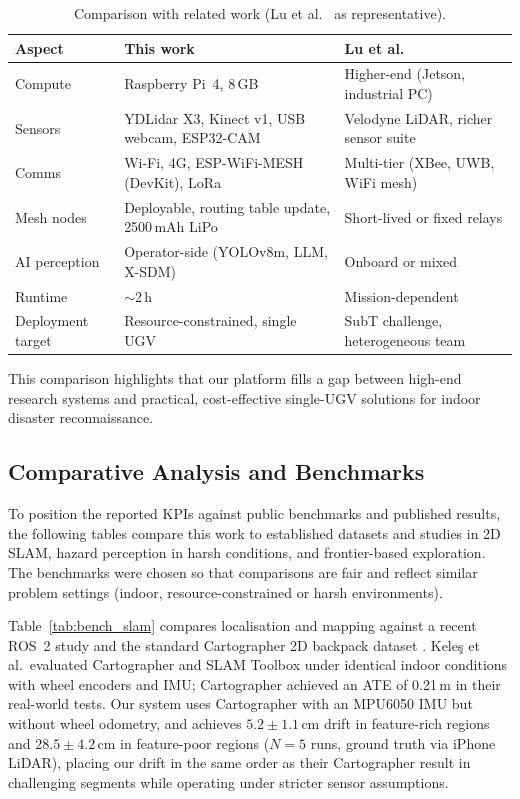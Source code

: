 \begin{table}[htbp]
\caption{Comparison with related work (Lu et al.\ \cite{lu2022} as representative).}
\label{tab:comparison}
\centering
\begin{tabular}{p{2cm}p{4cm}p{4cm}}
\toprule
\textbf{Aspect} & \textbf{This work} & \textbf{Lu et al.} \\
\midrule
Compute & Raspberry Pi~4, 8\,GB & Higher-end (Jetson, industrial PC) \\
Sensors & YDLidar X3, Kinect v1, USB webcam, ESP32-CAM & Velodyne LiDAR, richer sensor suite \\
Comms & Wi-Fi, 4G, ESP-WiFi-MESH (DevKit), LoRa & Multi-tier (XBee, UWB, WiFi mesh) \\
Mesh nodes & Deployable, routing table update, 2500\,mAh LiPo & Short-lived or fixed relays \\
AI perception & Operator-side (YOLOv8m, LLM, X-SDM) & Onboard or mixed \\
Runtime & $\sim$2\,h & Mission-dependent \\
Deployment target & Resource-constrained, single UGV & SubT challenge, heterogeneous team \\
\bottomrule
\end{tabular}
\end{table}

This comparison highlights that our platform fills a gap between high-end research systems and practical, cost-effective single-UGV solutions for indoor disaster reconnaissance.

\subsection{Comparative Analysis and Benchmarks}

To position the reported KPIs against public benchmarks and published results, the following tables compare this work to established datasets and studies in 2D SLAM, hazard perception in harsh conditions, and frontier-based exploration. The benchmarks were chosen so that comparisons are fair and reflect similar problem settings (indoor, resource-constrained or harsh environments).

Table~\ref{tab:bench_slam} compares localisation and mapping against a recent ROS~2 study \cite{keles2025} and the standard Cartographer 2D backpack dataset \cite{cartographerdata}. Kele{\c s} et al.\ evaluated Cartographer and SLAM Toolbox under identical indoor conditions with wheel encoders and IMU; Cartographer achieved an ATE of 0.21\,m in their real-world tests. Our system uses Cartographer with an MPU6050 IMU but without wheel odometry, and achieves $5.2 \pm 1.1$\,cm drift in feature-rich regions and $28.5 \pm 4.2$\,cm in feature-poor regions ($N=5$ runs, ground truth via iPhone LiDAR), placing our drift in the same order as their Cartographer result in challenging segments while operating under stricter sensor assumptions.

